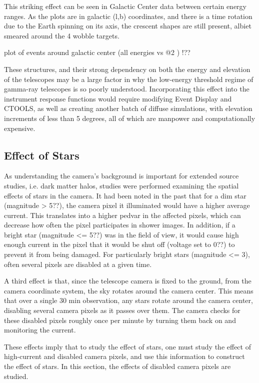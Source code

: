     This striking effect can be seen in Galactic Center data between certain energy ranges.
    As the plots are in galactic (l,b) coordinates, and there is a time rotation due to the Earth spinning on its axis, the crescent shapes are still present, albiet smeared around the 4 wobble targets.

    plot of events around galactic center (all energies vs @2 \TeV ) !??
    
    These structures, and their strong dependency on both the energy and elevation of the telescopes may be a large factor in why the low-energy threshold regime of gamma-ray telescopes is so poorly understood.
    Incorporating this effect into the instrument response functions would require modifying Event Display and CTOOLS, as well as creating another batch of diffuse simulations, with elevation increments of less than 5 degrees, all of which are manpower and computationally expensive.
    

  \subsection{Effect of Stars}
    As understanding the camera's background is important for extended source studies, i.e. dark matter halos, studies were performed examining the spatial effects of stars in the camera.
    It had been noted in the past that for a dim star (magnitude > 5??), the camera pixel it illuminated would have a higher average current.
    This translates into a higher pedvar in the affected pixels, which can decrease how often the pixel participates in shower images.
    In addition, if a bright star (magnitude <= 5??) was in the field of view, it would cause high enough current in the pixel that it would be shut off (voltage set to 0??) to prevent it from being damaged.
    For particularly bright stars (magnitude <= 3), often several pixels are disabled at a given time.

    A third effect is that, since the telescope camera is fixed to the ground, from the camera coordinate system, the sky rotates around the camera center.
    This means that over a single 30 min observation, any stars rotate around the camera center, disabling several camera pixels as it passes over them.
    The camera checks for these disabled pixels roughly once per minute by turning them back on and monitoring the current.

    These effects imply that to study the effect of stars, one must study the effect of high-current and disabled camera pixels, and use this information to construct the effect of stars.
    In this section, the effects of disabled camera pixels are studied.

